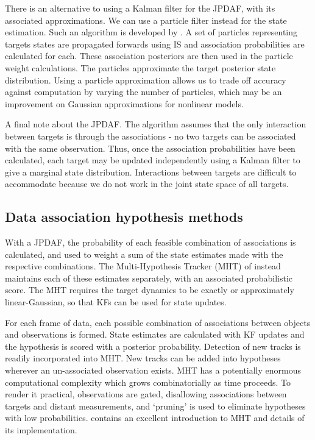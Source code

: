 There is an alternative to using a Kalman filter for the JPDAF, with its associated approximations. We can use a particle filter instead for the state estimation. Such an algorithm is developed by \cite{Schulz2001,Karlsson2001,Vermaak2005}. A set of particles representing targets states are propagated forwards using IS and association probabilities are calculated for each. These association posteriors are then used in the particle weight calculations. The particles approximate the target posterior state distribution. Using a particle approximation allows us to trade off accuracy against computation by varying the number of particles, which may be an improvement on Gaussian approximations for nonlinear models.

A final note about the JPDAF. The algorithm assumes that the only interaction between targets is through the associations - no two targets can be associated with the same observation. Thus, once the association probabilities have been calculated, each target may be updated independently using a Kalman filter to give a marginal state distribution. Interactions between targets are difficult to accommodate because we do not work in the joint state space of all targets.



\subsection{Data association hypothesis methods}
With a JPDAF, the probability of each feasible combination of associations is calculated, and used to weight a sum of the state estimates made with the respective combinations. The Multi-Hypothesis Tracker (MHT) of \cite{Reid1979} instead maintains each of these estimates separately, with an associated probabilistic score. The MHT requires the target dynamics to be exactly or approximately linear-Gaussian, so that KFs can be used for state updates.

For each frame of data, each possible combination of associations between objects and observations is formed. State estimates are calculated with KF updates and the hypothesis is scored with a posterior probability. Detection of new tracks is readily incorporated into MHT. New tracks can be added into hypotheses wherever an un-associated observation exists. MHT has a potentially enormous computational complexity which grows combinatorially as time proceeds. To render it practical, observations are gated, disallowing associations between targets and distant measurements, and `pruning' is used to eliminate hypotheses with low probabilities. \cite{Blackman2004} contains an excellent introduction to MHT and details of its implementation.

